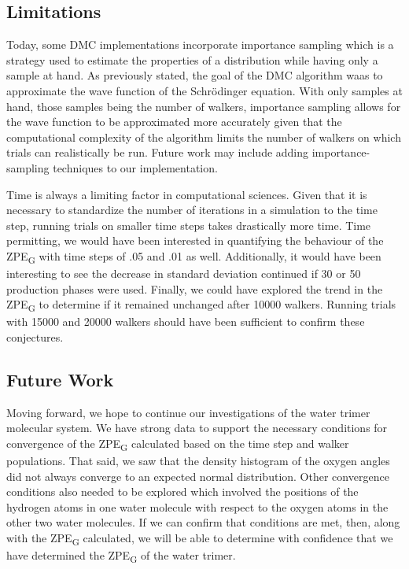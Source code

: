 \documentclass[journal=jacsat,manuscript=article]{achemso}
\begin{document}
\subsection{Limitations}

Today, some DMC implementations incorporate importance sampling\cite{Vihola2020} which is a strategy used to estimate the properties of a distribution while having only a sample at hand. As previously stated, the goal of the DMC algorithm waas to approximate the wave function of the Schr\"odinger equation. With only samples at hand, those samples being the number of walkers, importance sampling allows for the wave function to be approximated more accurately\cite{Bulik2018} given that the computational complexity of the algorithm limits the number of walkers on which trials can realistically be run. Future work may include adding importance-sampling techniques to our implementation. 

Time is always a limiting factor in computational sciences. Given that it is necessary to standardize the number of iterations in a simulation to the time step, running trials on smaller time steps takes drastically more time. Time permitting, we would have been interested in quantifying the behaviour of the ZPE\textsubscript{G} with time steps of .05 and .01 as well. Additionally, it would have been interesting to see the decrease in standard deviation continued if 30 or 50 production phases were used. Finally, we could have explored the trend in the ZPE\textsubscript{G} to determine if it remained unchanged after 10000 walkers. Running trials with 15000 and 20000 walkers should have been sufficient to confirm these conjectures.

\subsection{Future Work}

Moving forward, we hope to continue our investigations of the water trimer molecular system. We have strong data to support the necessary conditions for convergence of the ZPE\textsubscript{G} calculated based on the time step and walker populations. That said, we saw that the density histogram of the oxygen angles did not always converge to an expected normal distribution. Other convergence conditions also needed to be explored which involved the positions of the hydrogen atoms in one water molecule with respect to the oxygen atoms in the other two water molecules. If we can confirm that conditions are met, then, along with the ZPE\textsubscript{G} calculated, we will be able to determine with confidence that we have determined the ZPE\textsubscript{G} of the water trimer. 
\end{document}
